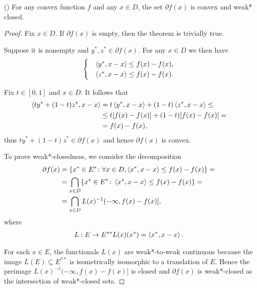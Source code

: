 \begin{proposition}\label{thm:convex_subdifferential_is_convex_and_weak*_closed}(\cite[exercise 1.10]{Phelps1993})
  For any convex function $f$ and any $x \in D$, the set $\partial f(x)$ is convex and weak* closed.
\end{proposition}
\begin{proof}
  Fix $x \in D$. If $\partial f(x)$ is empty, then the theorem is trivially true.

  Suppose it is nonempty and $y^*, z^* \in \partial f(x)$. For any $x \in D$ we then have
  \begin{align*}
    \begin{cases}
      &\left\langle y^*, x - x \right\rangle \leq f(x) - f(x), \\
      &\left\langle z^*, x - x \right\rangle \leq f(x) - f(x).
    \end{cases}
  \end{align*}

  Fix $t \in [0, 1]$ and $x \in D$. It follows that
  \begin{align*}
    \left\langle t y^* + (1-t) z^*, x - x \right\rangle
    &=
    t \left\langle y^*, x - x \right\rangle + (1-t) \left\langle z^*, x - x \right\rangle
    \leq \\ &\leq
    t [f(x) - f(x)] + (1-t) [f(x) - f(x)]
    = \\ &=
    f(x) - f(x),
  \end{align*}
  thus $t y^* + (1-t)z^* \in \partial f(x)$ and hence $\partial f(x)$ is convex.

  To prove weak*-closedness, we consider the decomposition
  \begin{align*}
    \partial f(x)
    &=
    \{ x^* \in E^* \colon \forall x \in D, \left\langle x^*, x - x \right\rangle \leq f(x) - f(x) \}
    = \\ &=
    \bigcap_{x \in D} \{ x^* \in E^* \colon \left\langle x^*, x - x \right\rangle \leq f(x) - f(x) \}
    = \\ &=
    \bigcap_{x \in D} L(x)^{-1} (-\infty, f(x) - f(x)],
  \end{align*}
  where
  \begin{align*}
    L: E \to E^{**}
    L(x)(x^*) = \left\langle x^*, x - x \right\rangle.
  \end{align*}

  For each $x \in E$, the functionals $L(x)$ are weak*-to-weak continuous because the image $L(E) \subseteq E^{**}$ is isometrically isomorphic to a translation of $E$. Hence the preimage $L(x)^{-1} (-\infty, f(x) - f(x)]$ is closed and $\partial f(x)$ is weak*-closed as the intersection of weak*-closed sets.
\end{proof}

